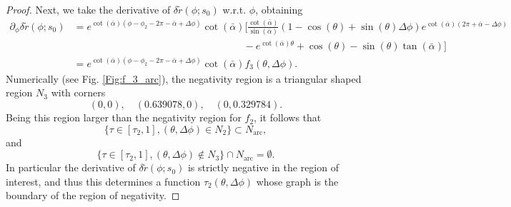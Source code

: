 \documentclass[reqno]{amsart}
\theoremstyle{definition} \newtheorem{definition}{Definition}[section]
\theoremstyle{definition} \newtheorem{remark}[definition]{Remark}
\theoremstyle{plain} \newtheorem{lemma}[definition]{Lemma}
\theoremstyle{plain} \newtheorem{proposition}[definition]{Proposition}
\theoremstyle{plain} \newtheorem{theorem}[definition]{Theorem}
\theoremstyle{plain} \newtheorem{corollary}[definition]{Corollary}
\theoremstyle{definition} \newtheorem{example}[definition]{Example}
\theoremstyle{plain} \newtheorem{claim}[clai]{Claim}
\theoremstyle{definition} \newtheorem{assumption}[definition]{Assumption}
\theoremstyle{definition} \newtheorem{observation}[definition]{Observation}
\newcommand{\1}{\mathbbm 1}
\numberwithin{equation}{section} %
\theoremstyle{plain} \newtheorem*{theorem*}{Theorem}
\theoremstyle{plain} \newtheorem{mthm}[maintheorem]{Main Theorem}
\theoremstyle{plain} \newtheorem*{mthm*}{Main Theorem}
\theoremstyle{plain} \newtheorem*{conjecture*}{Conjecture}
\theoremstyle{plain} \newtheorem{conjecture}[definition]{Conjecture}
\theoremstyle{plain} \newtheorem*{problem*}{Problem}
\begin{document}
\begin{proof}
Next, we take the derivative of $\delta \tilde r(\phi;s_0)$ w.r.t. $\phi$, obtaining
\begin{equation}
\label{Equa:f3_arc}
\begin{split}
\partial_\phi \delta \tilde r(\phi;s_0) &= e^{\cot(\bar \alpha)(\phi - \phi_2 - 2\pi - \bar \alpha + \Delta \phi)} \cot(\bar \alpha) \bigg[ \frac{\cot(\bar \alpha)}{\sin(\bar \alpha)} (1 - \cos(\theta) + \sin(\theta) \Delta \phi) e^{\cot(\bar \alpha) (2\pi + \bar \alpha - \Delta \phi)} \\
& \quad \qquad \qquad \qquad \qquad \qquad \qquad \qquad \qquad - e^{\cot(\bar \alpha) \theta} + \cos(\theta) - \sin(\theta) \tan(\bar \alpha) \bigg] \\
&= e^{\cot(\bar \alpha)(\phi - \phi_2 - 2\pi - \bar \alpha + \Delta \phi)} \cot(\bar \alpha) f_3(\theta,\Delta \phi).
\end{split}
\end{equation}
Numerically (see Fig. \ref{Fig:f_3_arc}), the negativity region is a triangular shaped region $N_3$ with corners
\begin{equation*}
    (0,0), \quad (0.639078,0), \quad (0,0.329784).
\end{equation*}
Being this region larger than the negativity region for $f_2$, it follows that
\begin{equation*}
    \big\{ \tau \in [\tau_2,1], (\theta,\Delta \phi) \in N_2 \big\} \subset N_{\mathrm{arc}},
\end{equation*}
and
\begin{equation*}
    \big\{ \tau \in [\tau_2,1], (\theta,\Delta \phi) \notin N_3 \big\} \cap N_\mathrm{arc} = \emptyset. 
\end{equation*}
In particular the derivative of $\delta \tilde r(\phi;s_0)$ is strictly negative in the region of interest, and thus this determines a function $\tau_2(\theta,\Delta \phi)$ whose graph is the boundary of the region of negativity.


\end{proof}
\end{document}
